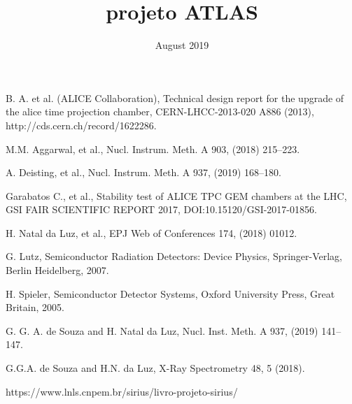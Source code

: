 \documentclass{report}
\title{projeto ATLAS}
\date{August 2019}
\begin{document}

%



\tableofcontents




%

%
\newpage
\begin{thebibliography}{9}



 B. A. et al. (ALICE Collaboration), Technical design report for the upgrade of the alice time projection chamber, CERN-LHCC-2013-020
A886 (2013), http://cds.cern.ch/record/1622286.


 M.M. Aggarwal, et al., Nucl. Instrum. Meth. A 903, (2018) 215–223. 

 A. Deisting, et al., Nucl. Instrum. Meth. A 937, (2019) 168–180.

%
 Garabatos C., et al., Stability test of ALICE TPC GEM chambers at the LHC, GSI FAIR SCIENTIFIC REPORT 2017, DOI:10.15120/GSI-2017-01856.
%

 H. Natal da Luz, et al., EPJ Web of Conferences 174, (2018) 01012.

 G. Lutz, Semiconductor Radiation Detectors: Device Physics, Springer-Verlag, Berlin Heidelberg, 2007. 

 H. Spieler, Semiconductor Detector Systems, Oxford University Press, Great Britain, 2005.


 G. G. A. de Souza and  H. Natal da Luz, Nucl. Inst. Meth. A 937, (2019) 141–147.

 G.G.A. de Souza and H.N. da Luz, X-Ray Spectrometry 48, 5 (2018).

 https://www.lnls.cnpem.br/sirius/livro-projeto-sirius/


\end{thebibliography}
\end{document}
